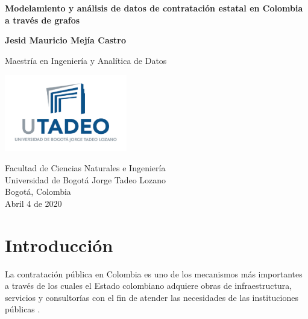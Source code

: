 \documentclass[11pt,letterpaper,oneside]{article}
\author{Jesid Mauricio Mejía Castro}
\begin{document}
	
	
	\begin{titlepage}
	   \begin{center}
	       \vspace*{1cm}
	
	       \textbf{Modelamiento y análisis de datos de contratación estatal en Colombia a través de grafos}
	
	       \vspace{0.5cm}
	            
	       \vspace{1.5cm} 
	
	       \textbf{Jesid Mauricio Mejía Castro}
	
	       \vspace{9.5cm}
	            
	       Maestría en Ingeniería y Analítica de Datos
	            
	       \vspace{0.4cm}
	     
	       \includegraphics[width=0.4\textwidth]{logo-utadeo-vert.jpg}
	            
	       Facultad de Ciencias Naturales e Ingeniería\\
	       Universidad de Bogotá Jorge Tadeo Lozano\\
	       Bogotá, Colombia\\
	       Abril 4 de 2020
	            
	   \end{center}
	\end{titlepage}
	
	\tableofcontents
	\newpage
	
	\section{Introducción}
	La contratación pública en Colombia es uno de los mecanismos más importantes a través de los cuales el Estado colombiano adquiere obras de infraestructura, servicios y consultorías con el fin de atender las necesidades de las instituciones públicas \cite{Angarita-2018}.
	
\end{document}
